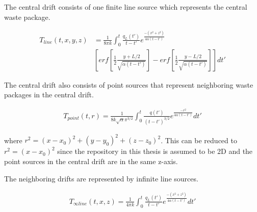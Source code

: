 The central drift consists of one finite line source which 
represents the central waste package. 

\begin{align}
	T_{line}(t,x,y,z) &= \frac{1}{8 \pi k}  \int_{0}^{t} 
	\frac{q_L(t')}{t-t'}e^{\frac{-(x^2+z^2)}{4\alpha(t-t')}} \\
	&[erf[\frac{1}{2}\frac{y+L/2}{\sqrt{\alpha(t-t')}}]-
	erf[\frac{1}{2}\frac{y-L/2}{\sqrt{\alpha(t-t')}}]] dt'
\end{align}

The central drift also consists of point sources that represent 
neighboring waste packages in the central drift. 

\begin{align}
	T_{point}(t,r) = \frac{1}{8 k \sqrt{\alpha} \pi^{3/2}} 
	\int_{0}^{t}\frac{q(t')}{(t-t')^{3/2}}e^{\frac{-r^2}
	{4\alpha(t-t')}}dt'
\end{align}

where $r^2 = (x-x_0)^2 + (y-y_0)^2 + (z-z_0)^2$. 
This can be reduced to $r^2 = (x-x_0)^2$ since the repository in 
this thesis is assumed to be 2D and the point sources in the central 
drift are in the same z-axis.  

The neighboring drifts are represented by infinite line sources.  

\begin{align}
	T_{\infty line}(t,x,z) = \frac{1}{4\pi k} \int_0^t 
	\frac{q_L(t')}{t-t'} e^{\frac{-(x^2+z^2)}{4\alpha (t-t')}} dt'
\end{align}

